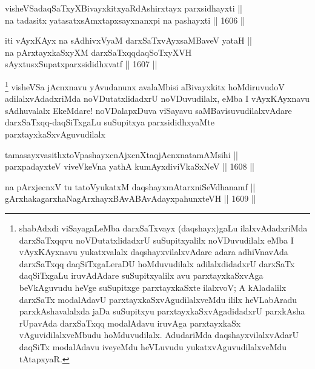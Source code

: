 \begin{shl}
visheVSadaqSaTxyXBivayxkitxyaRdAshirxtayx parxsidhayxti ||  \\
na tadasitx yatasatxsAmxtapxsayxnanxpi na pashayxti \hfill || 1606 ||  
\end{shl}


\begin{shl}
iti vAyxKAyx na sAdhivxVyaM darxSaTxvAyxsaMBaveV yataH || \\
na pArxtayxkaSxyXM darxSaTxqqdaqSoTxyXVH sAyxtusxSupatxparxsididhxvatf \hfill || 1607 ||  
\end{shl}

\begin{artha}
\footnote{shabAdxdi viSayagaLeMba darxSaTxvayx (daqshayx)gaLu ilalxvAdadxriMda darxSaTxqqvu noVDutatxlidadxrU suSupitxyalilx noVDuvudilalx eMba I vAyxKAyxnavu yukatxvalalx daqshayxvilalxvAdare adara adhiVnavAda darxSaTxqq daqSiTxgaLeraDU hoMduvudilalx adilalxdidadxrU darxSaTx daqSiTxgaLu iruvAdAdare suSupitxyalilx avu parxtayxkaSxvAga beVkAguvudu heVge suSupitxge parxtayxkaSxte ilalxvoV; A kAladalilx darxSaTx modalAdavU parxtayxkaSxvAgudilalxveMdu ililx heVLabAradu parxkAshavalalxda jaDa suSupitxyu parxtayxkaSxvAgadidadxrU parxkAsha rUpavAda darxSaTxqq modalAdavu iruvAga parxtayxkaSx vAguvidilalxveMbudu hoMduvudilalx. AdudariMda daqshayxvilalxvAdarU daqSiTx modalAdavu iveyeMdu heVLuvudu yukatxvAguvudilalxveMdu tAtapxyaR.}
visheVSa jAcnxnavu yAvudanunx avalaMbisi aBivayxkitx hoMdiruvudoV adilalxvAdadxriMda noVDutatxlidadxrU noVDuvudilalx, eMba I vAyxKAyxnavu sAdhuvalalx EkeMdare! noVDalapxDuva viSayavu saMBavisuvudilalxvAdare darxSaTxqq-daqSiTxgaLu suSupitxya parxsididhxyaMte parxtayxkaSxvAguvudilalx
\end{artha}


\begin{shl}
tamasayxvasithxtoV\s pashayxcnAjxcnXtaqjAcnxnatamAMsihi || \\
parxpadayxteV viveVkeVna yathA kumAyxdiviVkaSxNeV \hfill || 1608 ||  
\end{shl}

\begin{shl}
na pArxjecnxV tu tatoV\s yukatxM daqshayxmAtarxniSeVdhanamf || \\
gArxhakagarxhaNagArxhayxBAvABAvAdayxpahunxteVH \hfill || 1609 ||  
\end{shl}

